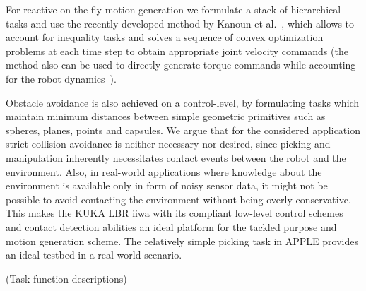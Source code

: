 For reactive on-the-fly motion generation we formulate a stack of hierarchical tasks and use the
recently developed method by Kanoun et al.~\cite{Kano11}, which allows to account for inequality
tasks and solves a sequence of convex optimization problems at each time step to obtain
appropriate joint velocity commands (the method also can be used to directly generate torque
commands while accounting for the robot dynamics~\cite{Saab13}).
 
Obstacle avoidance is also achieved on a control-level, by formulating tasks which maintain minimum
distances between simple geometric primitives such as spheres, planes, points and capsules. We argue
that for the considered application strict collision avoidance is neither necessary nor desired,
since picking and manipulation inherently necessitates contact events between the robot and the
environment. Also, in real-world applications where knowledge about the environment is available
only in form of noisy sensor data, it might not be possible to avoid contacting the environment
without being overly conservative. This makes the KUKA LBR iiwa with its compliant low-level control
schemes and contact detection abilities an ideal platform for the tackled purpose and motion
generation scheme. The relatively simple picking task in APPLE provides an ideal testbed in a
real-world scenario.

\cite{Kano09}(Task function descriptions)
%
